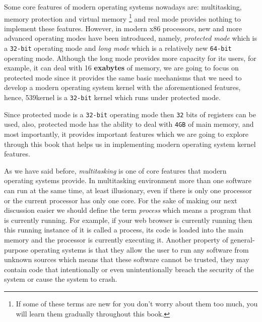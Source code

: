 Some core features of modern operating systems nowadays are:
multitasking, memory protection and virtual memory \footnote{If some of
  these terms are new for you don't worry about them too much, you will
  learn them gradually throughout this book.} and real mode provides
nothing to implement these features. However, in modern x86 processors,
new and more advanced operating modes have been introduced, namely,
\emph{protected mode} which is a \lstinline!32-bit! operating mode and
\emph{long mode} which is a relatively new \lstinline!64-bit! operating
mode. Although the long mode provides more capacity for its users, for
example, it can deal with 16 \textbf{exabytes} of memory, we are going
to focus on protected mode since it provides the same basic mechanisms
that we need to develop a modern operating system kernel with the
aforementioned features, hence, 539kernel is a \lstinline!32-bit! kernel
which runs under protected mode.

Since protected mode is a \lstinline!32-bit! operating mode then
\lstinline!32! bits of registers can be used, also, protected mode has
the ability to deal with \lstinline!4GB! of main memory, and most
importantly, it provides important features which we are going to
explore through this book that helps us in implementing modern operating
system kernel features.

As we have said before, \emph{multitasking} is one of core features that
modern operating systems provide. In multitasking environment more than
one software can run at the same time, at least illusionary, even if
there is only one processor or the current processor has only one core.
For the sake of making our next discussion easier we should define the
term \emph{process} which means a program that is currently running. For
example, if your web browser is currently running then this running
instance of it is called a process, its code is loaded into the main
memory and the processor is currently executing it. Another property of
general-purpose operating systems is that they allow the user to run any
software from unknown sources which means that these software cannot be
trusted, they may contain code that intentionally or even
unintentionally breach the security of the system or cause the system to
crash.


